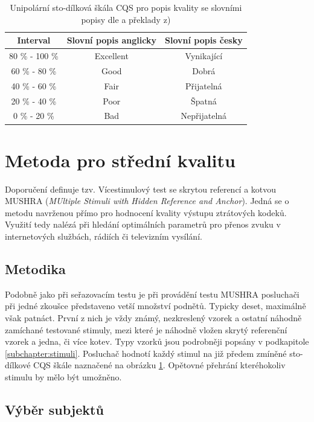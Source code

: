 \begin{table}[h]
\centering
\begin{tabular}{|c|c|c|}
\hline
Interval & Slovní popis anglicky & Slovní popis česky \\ \hline
80 \% - 100 \% & Excellent & Vynikající \\ \hline
60 \% - 80 \% & Good & Dobrá \\ \hline
40 \% - 60 \% & Fair & Přijatelná \\ \hline
20 \% - 40 \% & Poor & Špatná \\ \hline
0 \% - 20 \% & Bad & Nepřijatelná \\ \hline
\end{tabular}
\caption{Unipolární sto-dílková škála CQS pro popis kvality se slovními popisy dle \cite{itur:1284} a překlady z\cite{book:melka})}
\label{table:cqs}
\end{table}

\section{Metoda pro střední kvalitu}

Doporučení \cite{itur:1534} definuje tzv. Vícestimulový test se skrytou referencí a kotvou MUSHRA (\textit{MUltiple Stimuli with Hidden Reference and Anchor}). Jedná se o metodu navrženou přímo pro hodnocení kvality výstupu ztrátových kodeků. Využití tedy nalézá při hledání optimálních parametrů pro přenos zvuku v internetových službách, rádiích či televizním vysílání.

\subsection{Metodika} 

Podobně jako při seřazovacím testu je při provádění testu MUSHRA posluchači při jedné zkoušce představeno vetší množství podnětů. Typicky deset, maximálně však patnáct. První z nich je vždy známý, nezkreslený vzorek a ostatní náhodně zamíchané testované stimuly, mezi které je náhodně vložen skrytý referenční vzorek a jedna, či více kotev. Typy vzorků jsou podrobněji popsány v podkapitole \ref{subchapter:stimuli}. Posluchač hodnotí každý stimul na již předem zmíněné sto-dílkové CQS škále naznačené na obrázku \ref{table:cqs}. Opětovné přehrání kteréhokoliv stimulu by mělo být umožněno. 

\subsection{Výběr subjektů}

